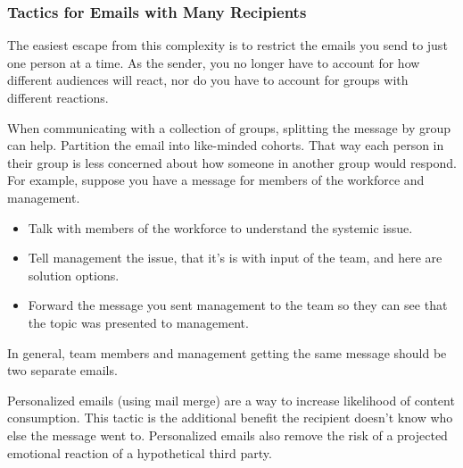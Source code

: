 \subsubsection*{Tactics for Emails with Many Recipients}
The easiest escape from this complexity is to restrict the emails you send to just one person at a time. As the sender, you no longer have to account for how different audiences will react, nor do you have to account for groups with different reactions.

When communicating with a collection of groups, splitting the message by group can help. Partition the email into like-minded cohorts. That way each person in their group is less concerned about how someone in another group would respond. For example, suppose you have a message for members of the workforce and management.
\begin{itemize}
\item Talk with members of the workforce to understand the systemic issue.
\item Tell management the issue, that it's is with input of the team, and here are solution options.
\item Forward the message you sent management to the team so they can see that the topic was presented to management.
\end{itemize}
In general, team members and management getting the same message should be two separate emails.

Personalized emails (using mail merge) are a way to increase likelihood of content consumption. This tactic is the additional benefit the recipient doesn't know who else the message went to. Personalized emails also remove the risk of a projected emotional reaction of a hypothetical third party.